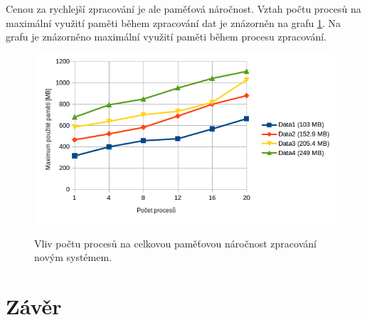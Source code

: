 Cenou za rychlejší zpracování je ale paměťová náročnost. Vztah počtu procesů na maximální
využití paměti během zpracování dat je znázorněn na grafu \ref{graph:graph_vertikalizace_pamet}.
Na grafu je znázorněno maximální využití paměti během procesu zpracování.

\begin{figure}[H]
    \begin{center}
        \label{graph:graph_vertikalizace_pamet}
        \includegraphics[width=1.0\textwidth]{obrazky-figures/graph_vertikalizace_pamet.png}
        \caption{Vliv počtu procesů na celkovou paměťovou náročnost zpracování novým systémem.}
    \end{center}
\end{figure}

\chapter{Závěr}
